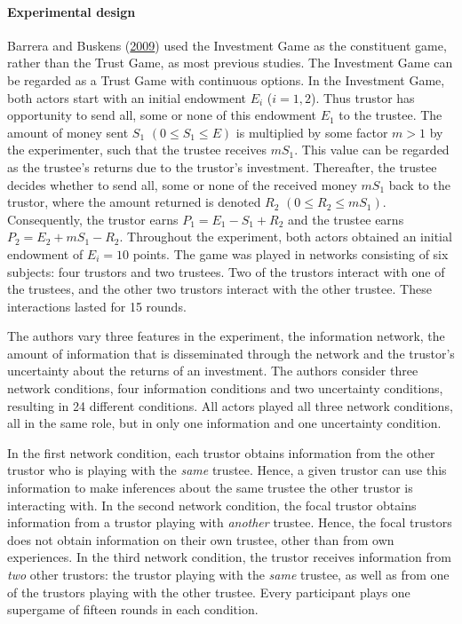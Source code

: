 \documentclass[
  11pt,
]{article}
\begin{document}
\hypertarget{experimental-design-7}{%
\paragraph{Experimental design}\label{experimental-design-7}}

Barrera and Buskens (\protect\hyperlink{ref-barrera_buskens_third_2009}{2009}) used the Investment Game as the constituent game, rather than the Trust Game, as most previous studies. The Investment Game can be regarded as a Trust Game with continuous options. In the Investment Game, both actors start with an initial endowment \(E_i\) (\(i = 1,2\)).
Thus trustor has opportunity to send all, some or none of this endowment \(E_1\) to the trustee. The amount of money sent \(S_1\) \((0 \leq S_1 \leq E)\) is multiplied by some factor \(m>1\) by the experimenter, such that the trustee receives \(mS_1\). This value can be regarded as the trustee's returns due to the trustor's investment.
Thereafter, the trustee decides whether to send all, some or none of the received money \(mS_1\) back to the trustor, where the amount returned is denoted \(R_2\) \((0 \leq R_2 \leq mS_1)\). Consequently, the trustor earns \(P_1 = E_1 - S_1 + R_2\) and the trustee earns \(P_2 = E_2 + mS_1 - R_2\).
Throughout the experiment, both actors obtained an initial endowment of \(E_i = 10\) points.
The game was played in networks consisting of six subjects: four trustors and two trustees. Two of the trustors interact with one of the trustees, and the other two trustors interact with the other trustee. These interactions lasted for 15 rounds.

The authors vary three features in the experiment, the information network, the amount of information that is disseminated through the network and the trustor's uncertainty about the returns of an investment. The authors consider three network conditions, four information conditions and two uncertainty conditions, resulting in 24 different conditions. All actors played all three network conditions, all in the same role, but in only one information and one uncertainty condition.

In the first network condition, each trustor obtains information from the other trustor who is playing with the \emph{same} trustee.
Hence, a given trustor can use this information to make inferences about the same trustee the other trustor is interacting with.
In the second network condition, the focal trustor obtains information from a trustor playing with \emph{another} trustee.
Hence, the focal trustors does not obtain information on their own trustee, other than from own experiences. In the third network condition, the trustor receives information from \emph{two} other trustors: the trustor playing with the \emph{same} trustee, as well as from one of the trustors playing with the other trustee. Every participant plays one supergame of fifteen rounds in each condition.
\end{document}
